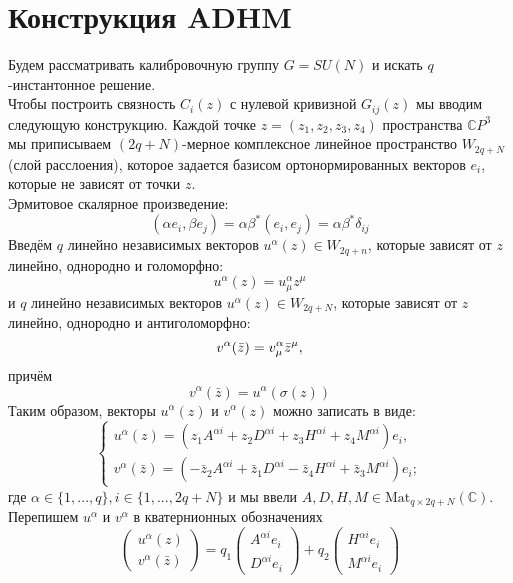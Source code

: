 \documentclass[12pt]{article}
\theoremstyle{definition}
\begin{document}
\section{Конструкция ADHM}
Будем рассматривать калибровочную группу $G=SU(N)$ и искать $q$-инстантонное решение.\\
Чтобы построить связность $C_i(z)$ с нулевой кривизной $G_{ij}(z)$ мы вводим следующую конструкцию. Каждой точке $z=(z_1, z_2, z_3, z_4)$ пространства $\mathbb{C}P^3$ мы приписываем $(2q + N)$-мерное комплексное линейное пространство $W_{2q+N}$ (слой расслоения), которое задается базисом ортонормированных векторов $e_i$, которые не зависят от точки $z$.\\
Эрмитовое скалярное произведение:
\begin{equation}
    (\alpha e_i,\beta e_j)=\alpha\beta^*(e_i,e_j)=\alpha\beta^*\delta_{ij}
\end{equation}
Введём $q$ линейно независимых векторов $u^\alpha(z)\in W_{2q+n}$, которые зависят от $z$ линейно, однородно и голоморфно:
\begin{equation}
    u^\alpha(z)=u^\alpha_\mu z^\mu
\end{equation}
и $q$ линейно независимых векторов $u^\alpha(z)\in W_{2q+N}$, которые зависят от $z$ линейно, однородно и антиголоморфно:
\begin{equation}
    v^\alpha(\Bar{z})=v^\alpha_\mu\bar{z}^\mu,
\end{equation}
причём
\begin{equation}
    v^\alpha(\bar{z})=u^\alpha(\sigma(z))
\end{equation}
Таким образом, векторы $u^\alpha(z)$ и $v^\alpha(z)$ можно записать в виде:
\begin{equation}
    \begin{cases}
        u^\alpha(z)=(z_1A^{\alpha i}+z_2D^{\alpha i}+z_3H^{\alpha i}+z_4M^{\alpha i})e_i,\\
        v^\alpha(\bar{z})=(-\bar{z}_2A^{\alpha i}+\bar{z}_1D^{\alpha i}-\bar{z}_4H^{\alpha i}+\bar{z}_3M^{\alpha i})e_i;
    \end{cases}
\end{equation}
где $\alpha\in\{1, ..., q\},i\in\{1,...,2q+N\}$ и мы ввели $A,D,H,M\in\text{Mat}_{q\times 2q + N}(\mathbb{C})$.\\
Перепишем $u^\alpha$ и $v^\alpha$ в кватернионных обозначениях
\begin{equation}
    \begin{pmatrix}
        u^\alpha(z)\\
        v^\alpha(\bar{z})
    \end{pmatrix}=q_1\begin{pmatrix}
        A^{\alpha i}e_i\\
        D^{\alpha i}e_i
    \end{pmatrix}+q_2\begin{pmatrix}
        H^{\alpha i}e_i\\
        M^{\alpha i}e_i
    \end{pmatrix}
\end{equation}
\end{document}
